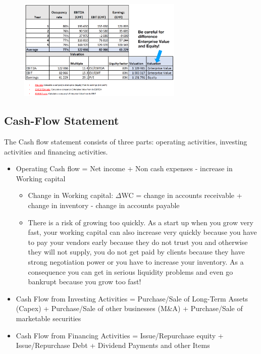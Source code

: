 \begin{figure}[h]
    \centering
    \includegraphics[width=0.7\textwidth]{Pictures/Valuation_taxi.png}
\end{figure}


\subsection{Cash-Flow Statement}
The Cash flow statement consists of three parts: operating activities, investing
activities and financing activities.
\begin{itemize}
    \item Operating Cash flow = Net income + Non cash expenses - increase in Working capital
        \begin{itemize}
            \item Change in Working capital: $\Delta$WC = change in accounts receivable + change in inventory - change in accounts payable
            \item There is a risk of growing too quickly. As a start up when you grow very fast,
                your working capital can also increase very quickly because you have to pay
                your vendors early because they do not trust you and otherwise they will not
                supply, you do not get paid by clients because they have strong negotiation power
                or you have to increase your inventory. As a consequence you can get in serious
                liquidity problems and even go bankrupt because you grow too fast!
        \end{itemize}
    \item Cash Flow from Investing Activities = Purchase/Sale of Long-Term Assets (Capex)
        + Purchase/Sale of other businesses (M\&A) + Purchase/Sale of marketable securities
\item Cash Flow from Financing Activities = Issue/Repurchase equity + Issue/Repurchase Debt
        + Dividend Payments and other Items
\end{itemize}

